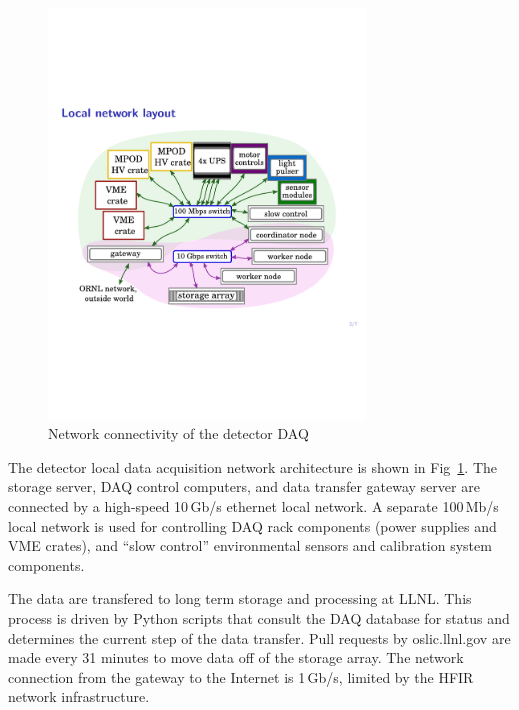 \begin{figure}
\includegraphics[width=0.75\textwidth]{figures/DAQ_NetworkPlan.pdf}
\caption{Network connectivity of the detector DAQ} \label{fg:daqnet}
\end{figure}

The detector local data acquisition network architecture is shown in Fig~\ref{fg:daqnet}.
The storage server, DAQ control computers, and data transfer gateway server are connected
	by a high-speed 10\,Gb/s ethernet local network.
A separate 100\,Mb/s local network is used for controlling DAQ rack components (power supplies and VME crates),
	and ``slow control'' environmental sensors and calibration system components.

The data are transfered to long term storage and processing at LLNL.
This process is driven by Python scripts that consult the DAQ database for status and determines the current step of the data transfer.
Pull requests by oslic.llnl.gov are made every 31 minutes to move data off of the storage array.
The network connection from the gateway to the Internet is 1\,Gb/s, limited by the HFIR network infrastructure.  
